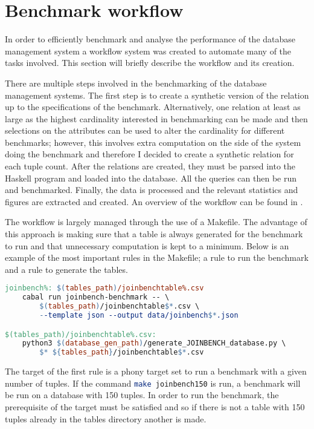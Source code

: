 \section{Benchmark workflow}\label{sec:benchmark:workflow}
In order to efficiently benchmark and analyse the performance of the database
management system a workflow system was created to automate many of the tasks
involved. This section will briefly describe the workflow and its creation.

There are multiple steps involved in the benchmarking of the database management
systems. The first step is to create a synthetic version of the
 relation up to the specifications of the benchmark.
Alternatively, one relation at least as large as the highest cardinality
interested in benchmarking can be made and then selections on the
 attributes can be used to alter the cardinality for
different benchmarks;
however, this involves extra computation on the side of the system doing the benchmark
and therefore I decided to create a synthetic relation for each tuple count.
After the relations are created, they must be parsed into the Haskell program
and loaded into the database. All the queries can then be run and benchmarked.
Finally, the data is processed and the relevant statistics and figures are
extracted and created. An overview of the workflow can be found in
.

The workflow is largely managed through the use of a Makefile. The advantage of this
approach is making sure that a table is always generated for the benchmark to
run and that unnecessary computation is kept to a minimum. Below is an example
of the most important rules in the Makefile; a rule to run the benchmark and a
rule to generate the tables.

\begin{lstlisting}[language=make]
joinbench%: $(tables_path)/joinbenchtable%.csv
	cabal run joinbench-benchmark -- \
        $(tables_path)/joinbenchtable$*.csv \ 
        --template json --output data/joinbench$*.json

$(tables_path)/joinbenchtable%.csv:
	python3 $(database_gen_path)/generate_JOINBENCH_database.py \
        $* ${tables_path}/joinbenchtable$*.csv
\end{lstlisting}

The target of the first rule is a phony target set to run a benchmark with a
given number of tuples. If the command \lstinline[language=bash]{make joinbench150}
is run, a benchmark will be run on a database with 150 tuples. In
order to run the benchmark, the prerequisite of the target must be satisfied and
so if there is not a table with 150 tuples already in the tables directory
another is made.

